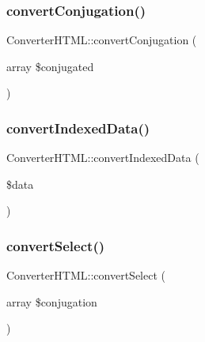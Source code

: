 \hypertarget{class_converter_h_t_m_l_ad759ada61baaa9aa4f4c0f1d67182c05}{}\label{class_converter_h_t_m_l_ad759ada61baaa9aa4f4c0f1d67182c05} 
\subsubsection{\texorpdfstring{convert\+Conjugation()}{convertConjugation()}}
{\footnotesize\ttfamily Converter\+H\+T\+M\+L\+::convert\+Conjugation (\begin{DoxyParamCaption}\item[{array}]{\$conjugated }\end{DoxyParamCaption})}

\hypertarget{class_converter_h_t_m_l_a8cda80b6e1312b5f11e47fc719a511b3}{}\label{class_converter_h_t_m_l_a8cda80b6e1312b5f11e47fc719a511b3} 
\subsubsection{\texorpdfstring{convert\+Indexed\+Data()}{convertIndexedData()}}
{\footnotesize\ttfamily Converter\+H\+T\+M\+L\+::convert\+Indexed\+Data (\begin{DoxyParamCaption}\item[{}]{\$data }\end{DoxyParamCaption})}

\hypertarget{class_converter_h_t_m_l_ae8152b5bc5d7a537c76e844df546dcbc}{}\label{class_converter_h_t_m_l_ae8152b5bc5d7a537c76e844df546dcbc} 
\subsubsection{\texorpdfstring{convert\+Select()}{convertSelect()}}
{\footnotesize\ttfamily Converter\+H\+T\+M\+L\+::convert\+Select (\begin{DoxyParamCaption}\item[{array}]{\$conjugation }\end{DoxyParamCaption})}

\hypertarget{class_converter_h_t_m_l_a385bc4a802dc51c920ea5152df4adcb3}{}\label{class_converter_h_t_m_l_a385bc4a802dc51c920ea5152df4adcb3} 
